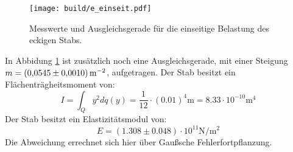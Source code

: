 \begin{figure}[H]
    \centering
    \texttt{[image: build/e\_einseit.pdf]}
    \caption{Messwerte und Ausgleichsgerade für die einseitige Belastung des eckigen Stabs.}
    \label{fig:plot2}
\end{figure}
In Abbidung \ref{fig:plot2} ist zusätzlich noch eine Ausgleichsgerade, mit einer Steigung $m=\SI[per-mode=reciprocal]{0.0545\pm0.001}{\per\meter\squared}$, aufgetragen.
Der Stab besitzt ein Flächenträgheitsmoment von:
\begin{equation*}
  I=\int_Q y^2 dq(y) = \frac{1}{12}\cdot (0.01)^4\si{\meter} = 8.33\cdot 10^{-10}\si{\meter}^4
\end{equation*}
Der Stab besitzt ein Elastizitätsmodul von:
\begin{equation*}
  E= (1.308\pm 0.048)\cdot10^{11} \si{\newton\per\meter\squared}
\end{equation*}
Die Abweichung errechnet sich hier über Gaußsche Fehlerfortpflanzung.
%
